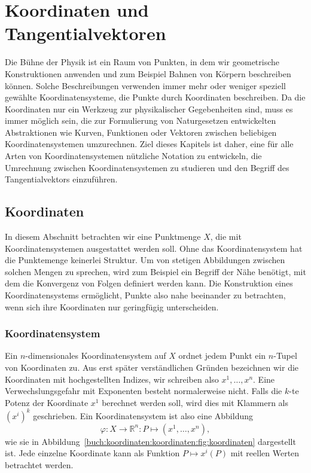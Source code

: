%
%
%
\chapter{Koordinaten und Tangentialvektoren
\label{chapter:koordinaten}}
Die Bühne der Physik ist ein Raum von Punkten, in dem wir geometrische
Konstruktionen anwenden und zum Beispiel Bahnen von Körpern beschreiben
können.
Solche Beschreibungen verwenden immer mehr oder weniger speziell gewählte
Koordinatensysteme, die Punkte durch Koordinaten beschreiben.
Da die Koordinaten nur ein Werkzeug zur physikalischer Gegebenheiten
sind, muss es immer möglich sein, die zur Formulierung von Naturgesetzen
entwickelten Abstraktionen wie Kurven, Funktionen oder Vektoren zwischen
beliebigen Koordinatensystemen umzurechnen.
Ziel dieses Kapitels ist daher, eine für alle Arten von Koordinatensystemen
nützliche Notation zu entwickeln, die Umrechnung zwischen Koordinatensystemen
zu studieren und den Begriff des Tangentialvektors einzuführen.

%
%
\section{Koordinaten
\label{buch:koordinaten:section:koordinaten}}
In diesem Abschnitt betrachten wir eine Punktmenge $X$, die mit
Koordinatensystemen ausgestattet werden soll.
Ohne das Koordinatensystem hat die Punktemenge keinerlei Struktur.
Um von stetigen Abbildungen zwischen solchen Mengen zu sprechen,
wird zum Beispiel ein Begriff der Nähe benötigt, mit dem die Konvergenz
von Folgen definiert werden kann.
Die Konstruktion eines Koordinatensystems ermöglicht, Punkte also
nahe beeinander zu betrachten, wenn sich ihre Koordinaten nur geringfügig
unterscheiden.

\subsection{Koordinatensystem}
%
Ein $n$-dimensionales Koordinatensystem auf $X$ ordnet jedem Punkt 
ein $n$-Tupel von Koordinaten zu.
Aus erst später verständlichen Gründen bezeichnen wir die Koordinaten
mit hochgestellten Indizes, wir schreiben also $x^1,\dots,x^n$.
Eine Verwechslungsgefahr mit Exponenten besteht normalerweise nicht.
Falls die $k$-te Potenz der Koordinate $x^1$ berechnet werden soll, 
wird dies mit Klammern als $(x^i)^k$ geschrieben.
Ein Koordinatensystem ist also eine Abbildung
\[
\varphi
\colon
X\to \mathbb{R}^n
:
P \mapsto (x^1,\dots,x^n),
\]
wie sie in Abbildung~\ref{buch:koordinaten:koordinaten:fig:koordinaten}
dargestellt ist.
Jede einzelne Koordinate kann als Funktion $P\mapsto x^i(P)$ mit
reellen Werten betrachtet werden.

